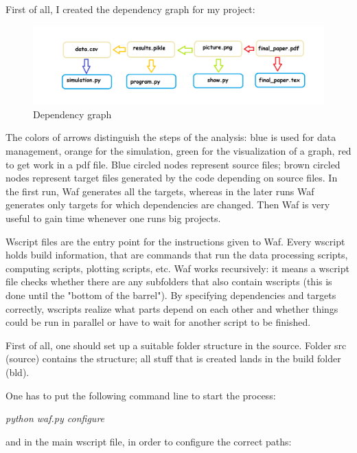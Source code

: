 \documentclass[11pt]{article}
\begin{document}
{\raggedright
First of all, I created the dependency graph for my project:
}

\begin{figure}[htbp] 
	\centering 
	\includegraphics[scale=0.4]
	{effective.png} 
	\caption{Dependency graph} 
	\label{fig:figuraSingola} 
\end{figure}

{\raggedright
The colors of arrows distinguish the steps of the analysis: blue is used for data management, orange for the simulation, green for the visualization of a graph, red to get work in a pdf file.
Blue circled nodes represent source files; brown circled nodes represent target files generated by the code depending on source files. 
In the first run, Waf generates all the targets, whereas in the later runs Waf generates only targets for which dependencies are changed. Then Waf is very useful to gain time whenever one runs big projects. 
}

{\raggedright
Wscript files are the entry point for the instructions given to Waf. Every wscript holds build information, that are commands that run the data processing scripts,  computing scripts, plotting scripts, etc. 
Waf works recursively: it means a wscript file checks whether there are any subfolders that also contain wscripts (this is done until the "bottom of the barrel"). By specifying dependencies and targets correctly, wscripts realize what parts depend on each other and whether things could be run in parallel or have to wait for another script to be finished.
}

{\raggedright
First of all, one should set up a suitable folder structure in the source. Folder src (source) contains the structure; all stuff that is created lands in the build folder (bld). 
 

}

{\raggedright
One has to put the following command line to start the process: ~
}

{\raggedright
\textit{{\small python waf.py configure  }}
}

{\raggedright
{\small and in the main wscript file, in order to configure the correct paths:}
}
\end{document}
